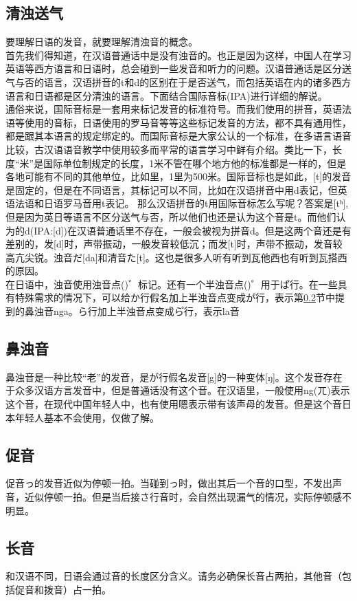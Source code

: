 \documentclass[12pt, a4paper, oneside]{book}
\newcommand{\jp}{\CJKfamily{zj}}
\begin{document}
\subsection{清浊送气}
要理解日语的发音，就要理解清浊音的概念。\\首先我们得知道，在汉语普通话中是没有浊音的。也正是因为这样，中国人在学习英语等西方语言和日语时，总会碰到一些发音和听力的问题。汉语普通话是区分送气与否的语言，汉语拼音的t和d的区别在于是否送气，而包括英语在内的诸多西方语言和日语都是区分清浊的语言。下面结合国际音标(IPA)进行详细的解说。
\\通俗来说，国际音标是一套用来标记发音的标准符号。而我们使用的拼音，英语法语等使用的音标，日语使用的罗马音等等这些标记发音的方法，都不具有通用性，都是跟其本语言的规定绑定的。而国际音标是大家公认的一个标准，在多语言语音比较，古汉语语音教学中使用较多而平常的语言学习中鲜有介绍。类比一下，长度“米”是国际单位制规定的长度，1米不管在哪个地方他的标准都是一样的，但是各地可能有不同的其他单位，比如里，1里为500米。国际音标也是如此，[t]的发音是固定的，但是在不同语言，其标记可以不同，比如在汉语拼音中用d表记，但英语法语和日语罗马音用t表记。
那么汉语拼音的t用国际音标怎么写呢？答案是[tʰ],但是因为英日等语言不区分送气与否，所以他们也还是认为这个音是t。而他们认为的d(IPA:[d])在汉语普通话里不存在，一般会被视为拼音d。但是这两个音还是有差别的，发[d]时，声带振动，一般发音较低沉；而发[t]时，声带不振动，发音较高亢尖锐。浊音だ[da]和清音た[t]。这也是很多人听{\jp {}}有听到瓦他西也有听到瓦搭西的原因。\\
在日语中，浊音使用浊音点({\jp {}})゛标记。还有一个半浊音点({\jp {}})゜用于ぱ行。在一些具有特殊需求的情况下，可以给か行假名加上半浊音点变成か゚行，表示第\ref{sct:bdo}节中提到的鼻浊音nga。ら行加上半浊音点变成ら゚行，表示la音
\subsection{鼻浊音}\label{sct:bdo}
鼻浊音是一种比较“老”的发音，是が行假名发音[g]的一种变体[ŋ]。这个发音存在于众多汉语方言发音中，但是普通话没有这个音。在汉语里，一般使用ng(ㄫ)表示这个音，在现代中国年轻人中，也有使用嗯表示带有该声母的发音。但是这个音日本年轻人基本不会使用，仅做了解。
\subsection{促音}
促音っ的发音近似为停顿一拍。当碰到っ时，做出其后一个音的口型，不发出声音，近似停顿一拍。但是当后接さ行音时，会自然出现漏气的情况，实际停顿感不明显。
\subsection{长音}
和汉语不同，日语会通过音的长度区分含义。请务必确保长音占两拍，其他音（包括促音和拨音）占一拍。
\end{document}
